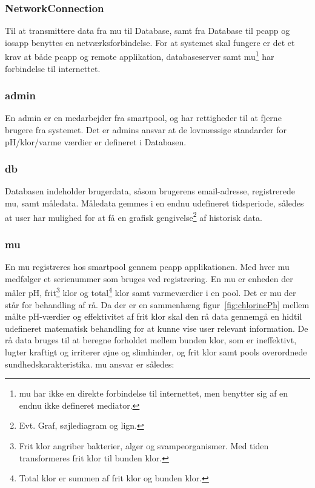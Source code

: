 \subsubsection{NetworkConnection}
Til at transmittere data fra \gls{mu} til Database, samt fra Database til \gls{pcapp} og \gls{iosapp} benyttes en netværksforbindelse.  For at systemet skal fungere er det et krav at både \gls{pcapp} og remote applikation, databaseserver samt \gls{mu}\footnote{\gls{mu} har ikke en direkte forbindelse til internettet, men benytter sig af en endnu ikke defineret mediator.} har forbindelse til internettet.

\subsubsection{\gls{admin}}
En \gls{admin} er en medarbejder fra \gls{smartpool}, og har rettigheder til at fjerne brugere fra systemet. Det er \glspl{admin} ansvar at de lovmæssige standarder  for pH/klor/varme værdier er defineret i Databasen.

\subsubsection{\gls{db}}
Databasen indeholder brugerdata, såsom brugerens email-adresse, registrerede \gls{mu}, samt måledata. Måledata gemmes i en endnu udefineret tidsperiode, således at \gls{user} har mulighed for at få en grafisk gengivelse\footnote{Evt. Graf, søjlediagram og lign.} af historisk data.

\subsubsection{\gls{mu}}
En \gls{mu} registreres hos \gls{smartpool} gennem \gls{pcapp} applikationen. Med hver \gls{mu} medfølger et serienummer som bruges ved registrering. En \gls{mu} er enheden der måler pH, frit\footnote{Frit klor angriber bakterier, alger og svampeorganismer. Med tiden transformeres frit klor til bunden klor.} klor og total\footnote{Total klor er summen af frit klor og bunden klor.} klor samt varmeværdier i en \gls{pool}. Det er \gls{mu} der står for behandling af rå. Da der er en sammenhæng figur~\ref{fig:chlorinePh} mellem målte pH-værdier og effektivitet af frit klor skal den rå data gennemgå en hidtil udefineret matematisk behandling for at kunne vise \gls{user} relevant information. De rå data bruges til at beregne forholdet mellem bunden klor, som er ineffektivt, lugter kraftigt og irriterer øjne og slimhinder, og frit klor samt \glspl{pool} overordnede sundhedskarakteristika. \gls{mu} ansvar er således:

